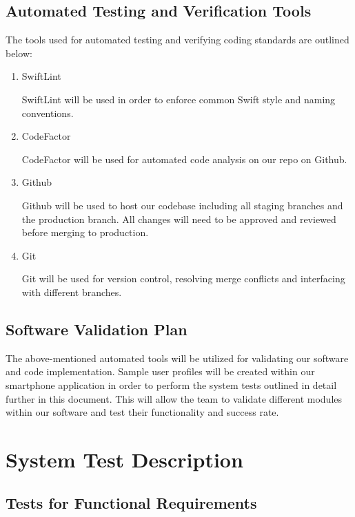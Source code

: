 \documentclass[12pt, titlepage]{article}
\begin{document}
\subsection{Automated Testing and Verification Tools}
The tools used for automated testing and verifying coding standards are outlined below:

\begin{enumerate}

\item SwiftLint

\subitem SwiftLint will be used in order to enforce common Swift style and naming conventions.

\item CodeFactor

\subitem CodeFactor will be used for automated code analysis on our repo on Github.

\item Github

\subitem Github will be used to host our codebase including all staging branches and the production branch. All changes will need to be approved and reviewed before merging to production.

\item Git

\subitem Git will be used for version control, resolving merge conflicts and interfacing with different branches.

\end{enumerate}

\subsection{Software Validation Plan}

The above-mentioned automated tools will be utilized for validating our software and code implementation. Sample user profiles will be created within our smartphone application in order to perform the system tests outlined in detail further in this document. This will allow the team to validate different modules within our software and test their functionality and success rate. 

\section{System Test Description}
	
\subsection{Tests for Functional Requirements}
\label{Section 5.1}
\end{document}

